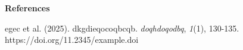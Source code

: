 \documentclass[12pt]{article}
\begin{document}
\noindent
\textbf{References}

\vspace{10pt}

\noindent
[6] egec et al. (2025). dkgdieqocoqbcqb. \textit{doqhdoqodbq}, \textit{1}(1), 130-135. https://doi.org/11.2345/example.doi
\end{document}
